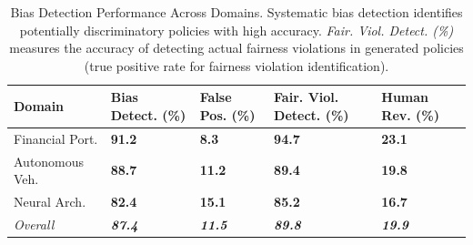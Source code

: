 \documentclass[manuscript,screen,review,anonymous,9pt]{acmart}
\newcommand{\tablesize}{\tiny}
\newcommand{\tablenumfmt}[1]{\textbf{#1}}
\newcommand{\tableheader}[1]{\textbf{#1}}
\begin{document}
\begin{table}[htbp]
  \centering
  \caption{Bias Detection Performance Across Domains. Systematic bias detection identifies potentially discriminatory policies with high accuracy. \textit{Fair. Viol. Detect. (\%)} measures the accuracy of detecting actual fairness violations in generated policies (true positive rate for fairness violation identification).}
  \label{tab:bias_detection_performance}
  \tablesize
  \begin{tabular}{@{}l>{\centering\arraybackslash}p{1.1cm}>{\centering\arraybackslash}p{1.1cm}>{\centering\arraybackslash}p{1.2cm}>{\centering\arraybackslash}p{1.1cm}@{}}
    \toprule
    \tableheader{Domain} & \tableheader{Bias Detect. (\%)} & \tableheader{False Pos. (\%)} & \tableheader{Fair. Viol. Detect. (\%)} & \tableheader{Human Rev. (\%)} \\
    \midrule
    Financial Port.    & \tablenumfmt{91.2} & \tablenumfmt{8.3}  & \tablenumfmt{94.7} & \tablenumfmt{23.1} \\
    Autonomous Veh.     & \tablenumfmt{88.7} & \tablenumfmt{11.2} & \tablenumfmt{89.4} & \tablenumfmt{19.8} \\
    Neural Arch.    & \tablenumfmt{82.4} & \tablenumfmt{15.1} & \tablenumfmt{85.2} & \tablenumfmt{16.7} \\
    \midrule
    \textit{Overall} & \textit{\tablenumfmt{87.4}} & \textit{\tablenumfmt{11.5}} & \textit{\tablenumfmt{89.8}} & \textit{\tablenumfmt{19.9}} \\
    \bottomrule
  \end{tabular}
\end{table}
\end{document}
